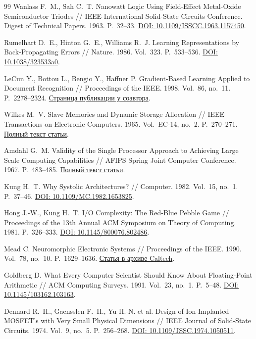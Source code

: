 \begin{thebibliography}{99}
Wanlass F.~M., Sah C.~T.
Nanowatt Logic Using Field-Effect Metal-Oxide Semiconductor Triodes //
IEEE International Solid-State Circuits Conference. Digest of Technical Papers.
1963. P.~32--33.
\href{https://doi.org/10.1109/ISSCC.1963.1157450}{DOI: 10.1109/ISSCC.1963.1157450}.

Rumelhart D.~E., Hinton G.~E., Williams R.~J.
Learning Representations by Back-Propagating Errors //
Nature. 1986. Vol.~323. P.~533--536.
\href{https://doi.org/10.1038/323533a0}{DOI: 10.1038/323533a0}.

LeCun Y., Bottou L., Bengio Y., Haffner P.
Gradient-Based Learning Applied to Document Recognition //
Proceedings of the IEEE. 1998. Vol.~86, no.~11. P.~2278--2324.
\href{https://bottou.org/papers/lecun-98h}{Страница публикации у соавтора}.

Wilkes M.~V.
Slave Memories and Dynamic Storage Allocation //
IEEE Transactions on Electronic Computers. 1965. Vol.~EC-14, no.~2. P.~270--271.
\href{https://www.cl.cam.ac.uk/teaching/2425/P56/files/wilkes1965cache.pdf}{Полный текст статьи}.

Amdahl G.~M.
Validity of the Single Processor Approach to Achieving Large Scale
Computing Capabilities // AFIPS Spring Joint Computer Conference.
1967. P.~483--485.
\href{https://www.cs.cmu.edu/~18742/papers/Amdahl1967.pdf}{Полный текст статьи}.

Kung H.~T. Why Systolic Architectures? //
Computer. 1982. Vol.~15, no.~1. P.~37--46.
\href{https://doi.org/10.1109/MC.1982.1653825}{DOI: 10.1109/MC.1982.1653825}.

Hong J.-W., Kung H.~T.
I/O Complexity: The Red-Blue Pebble Game //
Proceedings of the 13th Annual ACM Symposium on Theory of Computing.
1981. P.~326--333.
\href{https://doi.org/10.1145/800076.802486}{DOI: 10.1145/800076.802486}.

Mead C.
Neuromorphic Electronic Systems //
Proceedings of the IEEE. 1990. Vol.~78, no.~10. P.~1629--1636.
\href{https://authors.library.caltech.edu/records/j6gtc-ptx47}{Статья в архиве Caltech}.

Goldberg D.
What Every Computer Scientist Should Know About Floating-Point Arithmetic //
ACM Computing Surveys. 1991. Vol.~23, no.~1. P.~5--48.
\href{https://doi.org/10.1145/103162.103163}{DOI: 10.1145/103162.103163}.

Dennard R.~H., Gaensslen F.~H., Yu H.-N. et al.
Design of Ion-Implanted MOSFET's with Very Small Physical Dimensions //
IEEE Journal of Solid-State Circuits. 1974. Vol.~9, no.~5. P.~256--268.
\href{https://doi.org/10.1109/JSSC.1974.1050511}{DOI: 10.1109/JSSC.1974.1050511}.


\end{thebibliography}
